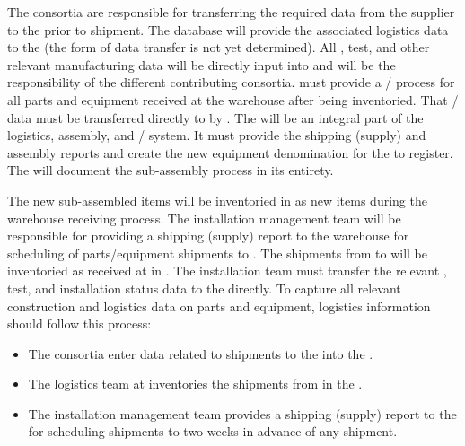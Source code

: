 The consortia are responsible for transferring the required data from the supplier to the  prior to shipment.  The  database will provide the associated logistics data to the  (the form of data transfer is not yet determined). 
All , %
test, and other relevant manufacturing data will be directly input into  and will be the responsibility of the different contributing consortia.  
 must provide a / process for all parts and equipment received at the warehouse after being inventoried. That / data must be transferred directly to  by .  The  will be an integral part of the logistics, assembly, and / system. It must provide the  shipping (supply) and assembly reports and create the new equipment denomination for the  to register.  The  will document the  sub-assembly process in its entirety.

The new sub-assembled items will be inventoried in  as new items during the warehouse receiving process. 
The  installation management team will be responsible for providing a shipping (supply) report to the warehouse for scheduling of parts/equipment shipments to .
The shipments from  to  will be inventoried as received at  in . 
The  installation team must transfer the relevant , %
test, and installation status data to the  directly.
To capture all relevant construction and logistics data on parts and equipment, logistics information should follow this process:

\begin{itemize}
\item The consortia %
enter data related to %
shipments to the  into the .
\item The logistics team at  inventories the shipments from  %
in the .
\item The  installation management team %
provides a shipping (supply) report to the %
 for scheduling shipments %
to  two weeks in advance of any shipment.
\end{itemize}

